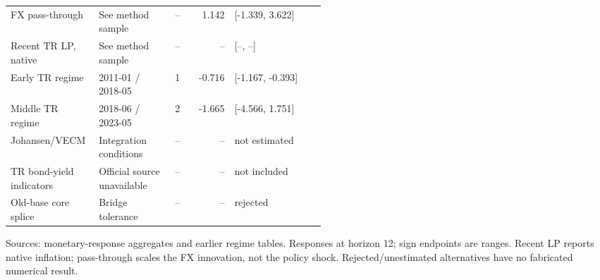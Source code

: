 \begin{table}[htbp]
\begin{tabularx}{\linewidth}{p{0.29\linewidth}p{0.23\linewidth}rrX}
FX pass-through & See method sample & -- & 1.142 & [-1.339, 3.622] \\
Recent TR LP, native & See method sample & -- & -- & [--, --] \\
Early TR regime & 2011-01 / 2018-05 & 1 & -0.716 & [-1.167, -0.393] \\
Middle TR regime & 2018-06 / 2023-05 & 2 & -1.665 & [-4.566, 1.751] \\
Johansen/VECM & Integration conditions & -- & -- & not estimated \\
TR bond-yield indicators & Official source unavailable & -- & -- & not included \\
Old-base core splice & Bridge tolerance & -- & -- & rejected \\
\bottomrule
\end{tabularx}
\par\vspace{3pt}\begin{minipage}{\linewidth}\footnotesize Sources: monetary-response aggregates and earlier regime tables.\allowbreak{} Responses at horizon 12; sign endpoints are ranges.\allowbreak{} Recent LP reports native inflation; pass-through scales the FX innovation, not the policy shock.\allowbreak{} Rejected/unestimated alternatives have no fabricated numerical result.\allowbreak{}\end{minipage}
\end{table}

